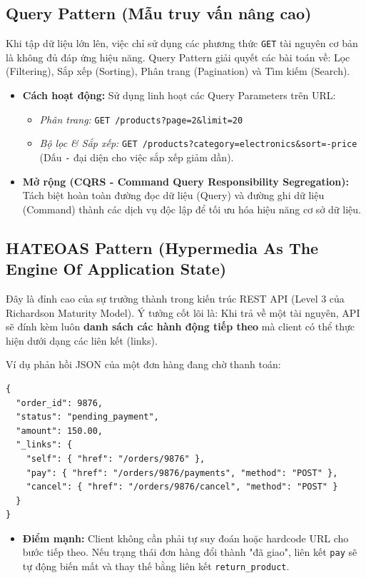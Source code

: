 \documentclass[12pt,a4paper]{article}
\begin{document}
\subsection{Query Pattern (Mẫu truy vấn nâng cao)}
Khi tập dữ liệu lớn lên, việc chỉ sử dụng các phương thức \texttt{GET} tài nguyên cơ bản là không đủ đáp ứng hiệu năng. Query Pattern giải quyết các bài toán về: Lọc (Filtering), Sắp xếp (Sorting), Phân trang (Pagination) và Tìm kiếm (Search).
\begin{itemize}
    \item \textbf{Cách hoạt động:} Sử dụng linh hoạt các Query Parameters trên URL:
    \begin{itemize}
        \item \textit{Phân trang:} \texttt{GET /products?page=2\&limit=20}
        \item \textit{Bộ lọc \& Sắp xếp:} \texttt{GET /products?category=electronics\&sort=-price} (Dấu \texttt{-} đại diện cho việc sắp xếp giảm dần).
    \end{itemize}
    \item \textbf{Mở rộng (CQRS - Command Query Responsibility Segregation):} Tách biệt hoàn toàn đường đọc dữ liệu (Query) và đường ghi dữ liệu (Command) thành các dịch vụ độc lập để tối ưu hóa hiệu năng cơ sở dữ liệu.
\end{itemize}

\subsection{HATEOAS Pattern (Hypermedia As The Engine Of Application State)}
Đây là đỉnh cao của sự trưởng thành trong kiến trúc REST API (Level 3 của Richardson Maturity Model). Ý tưởng cốt lõi là: Khi trả về một tài nguyên, API sẽ đính kèm luôn \textbf{danh sách các hành động tiếp theo} mà client có thể thực hiện dưới dạng các liên kết (links).

Ví dụ phản hồi JSON của một đơn hàng đang chờ thanh toán:
\begin{lstlisting}
{
  "order_id": 9876,
  "status": "pending_payment",
  "amount": 150.00,
  "_links": {
    "self": { "href": "/orders/9876" },
    "pay": { "href": "/orders/9876/payments", "method": "POST" },
    "cancel": { "href": "/orders/9876/cancel", "method": "POST" }
  }
}
\end{lstlisting}
\begin{itemize}
    \item \textbf{Điểm mạnh:} Client không cần phải tự suy đoán hoặc hardcode URL cho bước tiếp theo. Nếu trạng thái đơn hàng đổi thành "đã giao", liên kết \texttt{pay} sẽ tự động biến mất và thay thế bằng liên kết \texttt{return\_product}.
\end{itemize}
\end{document}
